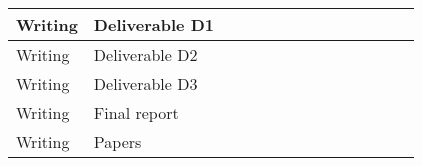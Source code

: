 \begin{table}[t!]
\begin{tabular}{|p{0.80cm}|p{5.00cm}|p{0.40cm}|p{0.40cm}|p{0.40cm}|p{0.40cm}|p{0.40cm}|p{0.40cm}|p{0.40cm}|p{0.40cm}|p{0.40cm}|p{0.40cm}|p{0.40cm}|p{0.40cm}|}
		Writing & Deliverable D1 &  &  & \cellcolor{lightgray} & \cellcolor{lightgray} &  &   &  &   &  &   &   &   \\ \hline
		Writing & Deliverable D2 &  &  &   &   &  &   & \cellcolor{lightgray} & \cellcolor{lightgray} &  &   &   &   \\ \hline
		Writing & Deliverable D3 &  &  &   &   &  &   &   &   &  &   & \cellcolor{lightgray} & \cellcolor{lightgray} \\ \hline
		Writing & Final report &  &  &  &  &  &   &  &  &  &  \cellcolor{lightgray} & \cellcolor{lightgray} & \cellcolor{lightgray} \\ \hline
		Writing & Papers & \cellcolor{lightgray} & \cellcolor{lightgray}  & \cellcolor{lightgray} & \cellcolor{lightgray} & \cellcolor{lightgray} &  \cellcolor{lightgray} & \cellcolor{lightgray} & \cellcolor{lightgray} & \cellcolor{lightgray} &  \cellcolor{lightgray} & \cellcolor{lightgray} & \cellcolor{lightgray} \\ \hline
	\end{tabular}
	\label{tab:GanttChart}
\end{table}


